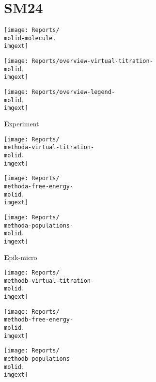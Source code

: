 \documentclass[9pt]{standalone}
\begin{document}
\newcommand{\molid}{SM24}
\newcommand{\imgext}{pdf}
\newcommand{\methoda}{Experiment}
\newcommand{\methodb}{Epik-micro}
\newcommand{\methodc}{Epik-macro}
\newcommand{\methodd}{Epik-scan}
\newcommand{\methode}{Jaguar-micro}
\newcommand{\methodf}{Jaguar-macro}
\section{\molid}
\noindent 
\begin{minipage}[s]{0.35\textwidth}\centering
\texttt{[image: Reports/\\molid-molecule.\\imgext]}
\end{minipage}
\begin{minipage}[s]{0.35\textwidth}
\texttt{[image: Reports/overview-virtual-titration-\\molid.\\imgext]}
\end{minipage}
\begin{minipage}[s]{0.23\textwidth}
\texttt{[image: Reports/overview-legend-\\molid.\\imgext]}
\end{minipage}

\begin{minipage}[s]{\textwidth}\centering
{\textbf \methoda}
\end{minipage}

\noindent
\begin{minipage}[s]{0.33\textwidth}\centering
\texttt{[image: Reports/\\methoda-virtual-titration-\\molid.\\imgext]}
\end{minipage}
\begin{minipage}[s]{0.33\textwidth}
\texttt{[image: Reports/\\methoda-free-energy-\\molid.\\imgext]}
\end{minipage}
\begin{minipage}[s]{0.33\textwidth}
\texttt{[image: Reports/\\methoda-populations-\\molid.\\imgext]}
\end{minipage}

\begin{minipage}[s]{\textwidth}\centering
{\textbf \methodb}
\end{minipage}

\noindent
\begin{minipage}[s]{0.33\textwidth}\centering
\texttt{[image: Reports/\\methodb-virtual-titration-\\molid.\\imgext]}
\end{minipage}
\begin{minipage}[s]{0.33\textwidth}
\texttt{[image: Reports/\\methodb-free-energy-\\molid.\\imgext]}
\end{minipage}
\begin{minipage}[s]{0.33\textwidth}
\texttt{[image: Reports/\\methodb-populations-\\molid.\\imgext]}
\end{minipage}
\end{document}
